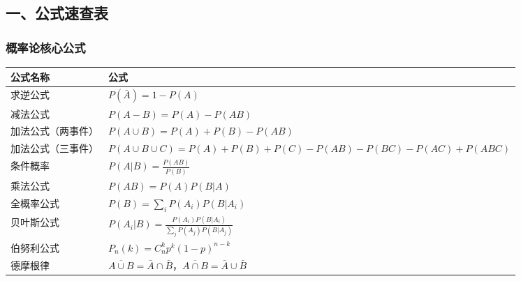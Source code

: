 \documentclass[12pt,a4paper]{ctexart}
\begin{document}
\subsection{一、公式速查表}

\subsubsection{概率论核心公式}
\begin{center}
    \begin{tabular}{@{}ll@{}}
        \toprule
        \textbf{公式名称} & \textbf{公式}                                                                               \\ \midrule
        求逆公式          & $P(\bar{A}) = 1 - P(A)$                                                                   \\
        减法公式          & $P(A-B) = P(A) - P(AB)$                                                                   \\
        加法公式（两事件）     & $P(A \cup B) = P(A) + P(B) - P(AB)$                                                       \\
        加法公式（三事件）     & $P(A \cup B \cup C) = P(A)+P(B)+P(C) - P(AB)-P(BC)-P(AC) + P(ABC)$                        \\
        条件概率          & $P(A|B) = \frac{P(AB)}{P(B)}$                                                             \\
        乘法公式          & $P(AB) = P(A)P(B|A)$                                                                      \\
        全概率公式         & $P(B) = \sum_i P(A_i)P(B|A_i)$                                                            \\
        贝叶斯公式         & $P(A_i|B) = \frac{P(A_i)P(B|A_i)}{\sum_j P(A_j)P(B|A_j)}$                                 \\
        伯努利公式         & $P_n(k) = C_n^k p^k (1-p)^{n-k}$                                                          \\
        德摩根律          & $\overline{A \cup B} = \bar{A} \cap \bar{B}$，$\overline{A \cap B} = \bar{A} \cup \bar{B}$ \\ \bottomrule
    \end{tabular}
\end{center}
\end{document}
